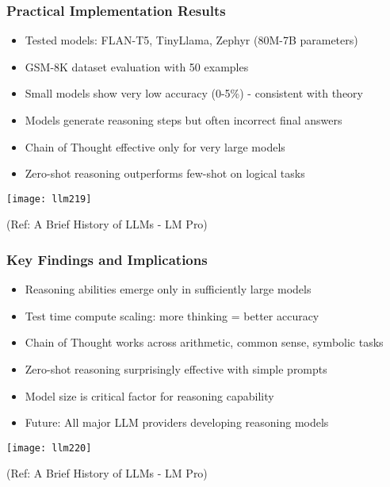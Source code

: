 \begin{frame}[fragile]\frametitle{Practical Implementation Results}

      \begin{itemize}
        \item Tested models: FLAN-T5, TinyLlama, Zephyr (80M-7B parameters)
        \item GSM-8K dataset evaluation with 50 examples
        \item Small models show very low accuracy (0-5\%) - consistent with theory
        \item Models generate reasoning steps but often incorrect final answers
        \item Chain of Thought effective only for very large models
        \item Zero-shot reasoning outperforms few-shot on logical tasks
      \end{itemize}

        \begin{center}
        \texttt{[image: llm219]}
		
		{\tiny (Ref: A Brief History of LLMs - LM Pro)}
        \end{center}	

\end{frame}

\begin{frame}[fragile]\frametitle{Key Findings and Implications}

      \begin{itemize}
        \item Reasoning abilities emerge only in sufficiently large models
        \item Test time compute scaling: more thinking = better accuracy
        \item Chain of Thought works across arithmetic, common sense, symbolic tasks
        \item Zero-shot reasoning surprisingly effective with simple prompts
        \item Model size is critical factor for reasoning capability
        \item Future: All major LLM providers developing reasoning models
      \end{itemize}

        \begin{center}
        \texttt{[image: llm220]}
		
		{\tiny (Ref: A Brief History of LLMs - LM Pro)}
        \end{center}	

\end{frame}